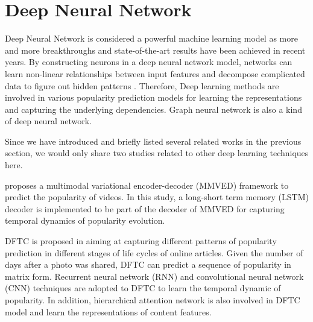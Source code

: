 \section{Deep Neural Network}

Deep Neural Network is considered a powerful machine learning model as more and more breakthroughs and state-of-the-art results have been achieved in recent years. By constructing neurons in a deep neural network model, networks can learn non-linear relationships between input features and decompose complicated data to figure out hidden patterns \cite{DNN_2015}. Therefore, Deep learning methods are involved in various popularity prediction models for learning the representations and capturing the underlying dependencies. Graph neural network is also a kind of deep neural network. 

Since we have introduced and briefly listed several related works in the previous section, we would only share two studies related to other deep learning techniques here.

\cite{inproceedings} proposes a multimodal variational encoder-decoder (MMVED) framework to predict the popularity of videos. In this study, a long-short term memory (LSTM) decoder is implemented to be part of the decoder of MMVED for capturing temporal dynamics of popularity evolution.

DFTC is proposed in \cite{Liao_Xu_Li_Huang_Liu_Li_2019} aiming at capturing different patterns of popularity prediction in different stages of life cycles of online articles. Given the number of days after a photo was shared, DFTC can predict a sequence of popularity in matrix form. Recurrent neural network (RNN) and convolutional neural network (CNN) techniques are adopted to DFTC to learn the temporal dynamic of popularity. In addition, hierarchical attention network is also involved in DFTC model and learn the representations of content features.

